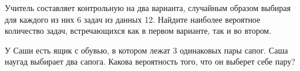 \documentclass[a4paper,12pt]{article}
\begin{document}
  Учитель составляет контрольную на два варианта, случайным образом выбирая для каждого из них 6 задач из данных 12. Найдите наиболее вероятное количество задач, встречающихся как в первом варианте, так и во втором.

  У Саши есть ящик с обувью, в котором лежат 3 одинаковых пары сапог. Саша наугад выбирает два сапога. Какова вероятность того, что он выберет себе пару?








\end{document}

